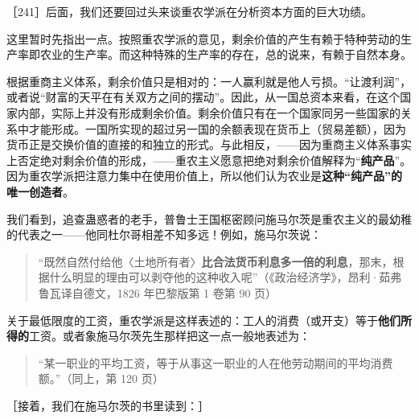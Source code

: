 ［241］后面，我们还要回过头来谈重农学派在分析资本方面的巨大功绩。

这里暂时先指出一点。按照重农学派的意见，剩余价值的产生有赖于特种劳动的生产率即农业的生产率。而这种特殊的生产率的存在，总的说来，有赖于自然本身。

根据重商主义体系，剩余价值只是相对的：一人赢利就是他人亏损。“让渡利润”，或者说“财富的天平在有关双方之间的摆动”。因此，从一国总资本来看，在这个国家内部，实际上并没有形成剩余价值。剩余价值只有在一个国家同另一些国家的关系中才能形成。一国所实现的超过另一国的余额表现在货币上（贸易差额），因为货币正是交换价值的直接的和独立的形式。与此相反，——因为重商主义体系事实上否定绝对剩余价值的形成，——重农主义愿意把绝对剩余价值解释为“\textbf{纯产品}”。因为重农学派把注意力集中在使用价值上，所以他们认为农业是\textbf{这种“纯产品”的唯一创造者}。


我们看到，追查蛊惑者的老手，普鲁士王国枢密顾问施马尔茨是重农主义的最幼稚的代表之一——他同杜尔哥相差不知多远！例如，施马尔茨说：

\begin{quote}“既然自然付给他〈土地所有者〉\textbf{比合法货币利息多一倍的利息}，那末，根据什么明显的理由可以剥夺他的这种收入呢”（《政治经济学》，昂利·茹弗鲁瓦译自德文，1826 年巴黎版第 1 卷第 90 页）\end{quote}

关于最低限度的工资，重农学派是这样表述的：工人的消费（或开支）等于\textbf{他们所得的}工资。或者象施马尔茨先生那样把这一点一般地表述为：

\begin{quote}“某一职业的平均工资，等于从事这一职业的人在他劳动期间的平均消费额。”（同上，第 120 页）\end{quote}

［接着，我们在施马尔茨的书里读到：］

